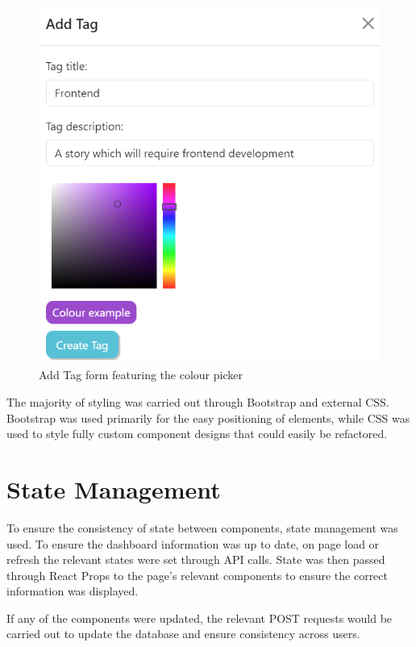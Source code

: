 \documentclass[l4proj.tex]{subfiles}
\begin{document}
\begin{figure}[h!]
\begin{center}
\includegraphics[scale=0.4]{dissertation/images/TagFormColourExample.png}
\caption{Add Tag form featuring the colour picker}
\label{fig:Tag form colour example} 
\end{center}
\end{figure}

The majority of styling was carried out through Bootstrap and external CSS. Bootstrap was used primarily for the easy positioning of elements, while CSS was used to style fully custom component designs that could easily be refactored. 

\section{State Management}
To ensure the consistency of state between components, state management was used. To ensure the dashboard information was up to date, on page load or refresh the relevant states were set through API calls. State was then passed through React Props to the page's relevant components to ensure the correct information was displayed. 

If any of the components were updated, the relevant POST requests would be carried out to update the database and ensure consistency across users.
\end{document}
